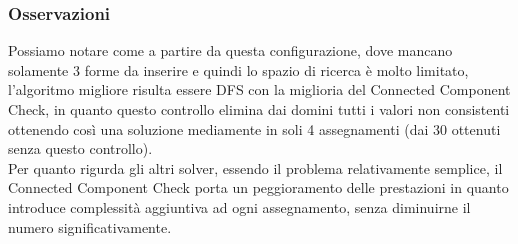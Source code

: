 \subsubsection{Osservazioni}
Possiamo notare come a partire da questa configurazione, dove mancano solamente 3 forme da inserire e quindi lo spazio di ricerca è molto limitato, l'algoritmo migliore risulta essere DFS con la miglioria del Connected Component Check, in quanto questo controllo elimina dai domini tutti i valori non consistenti ottenendo così una soluzione mediamente in soli 4 assegnamenti (dai 30 ottenuti senza questo controllo).\\
Per quanto rigurda gli altri solver, essendo il problema relativamente semplice, il Connected Component Check porta un peggioramento delle prestazioni in quanto introduce complessità aggiuntiva ad ogni assegnamento, senza diminuirne il numero significativamente.

